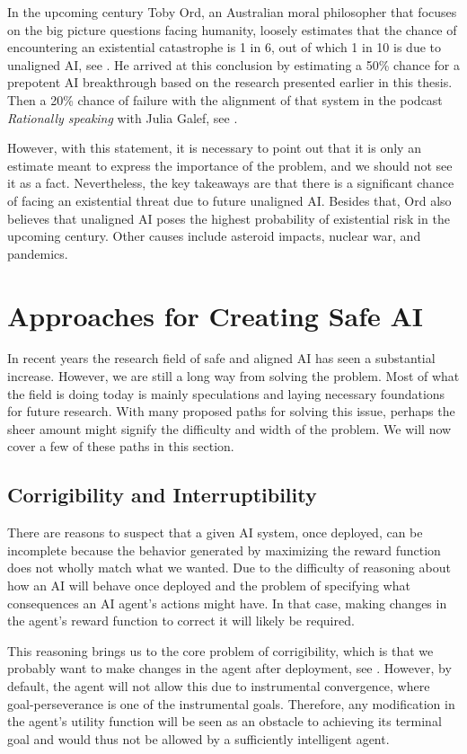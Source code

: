 \documentclass[12pt,A4]{report}
\theoremstyle{definition}
\begin{document}
In the upcoming century Toby Ord, an Australian moral philosopher that focuses on the big picture questions facing humanity, loosely estimates that the chance of encountering an existential catastrophe is 1 in 6, out of which 1 in 10 is due to unaligned  AI, see \citet[c.6]{Precipice}. He arrived at this conclusion by estimating a 50\% chance for a prepotent AI breakthrough based on the research presented earlier in this thesis. Then a 20\% chance of failure with the alignment of that system in the podcast \textit{Rationally speaking} with Julia Galef, see \citet[26:15]{RationallySpeaking}. 

However, with this statement, it is necessary to point out that it is only an estimate meant to express the importance of the problem, and we should not see it as a fact. Nevertheless, the key takeaways are that there is a significant chance of facing an existential threat due to future unaligned AI. Besides that, Ord also believes that unaligned AI poses the highest probability of existential risk in the upcoming century. Other causes include asteroid impacts, nuclear war, and pandemics. 


\section{Approaches for Creating Safe AI}
In recent years the research field of safe and aligned AI has seen a substantial increase. However, we are still a long way from solving the problem. Most of what the field is doing today is mainly speculations and laying necessary foundations for future research. With many proposed paths for solving this issue, perhaps the sheer amount might signify the difficulty and width of the problem. We will now cover a few of these paths in this section.


\subsection{Corrigibility and Interruptibility }
There are reasons to suspect that a given AI system, once deployed, can be incomplete because the behavior generated by maximizing the reward function does not wholly match what we wanted. Due to the difficulty of reasoning about how an AI will behave once deployed and the problem of specifying what consequences an AI agent's actions might have. In that case, making changes in the agent's reward function to correct it will likely be required.  

This reasoning brings us to the core problem of corrigibility, which is that we probably want to make changes in the agent after deployment, see \citet{Corrigibility}. However, by default, the agent will not allow this due to instrumental convergence, where goal-perseverance is one of the instrumental goals. Therefore, any modification in the agent's utility function will be seen as an obstacle to achieving its terminal goal and would thus not be allowed by a sufficiently intelligent agent. 
\end{document}
